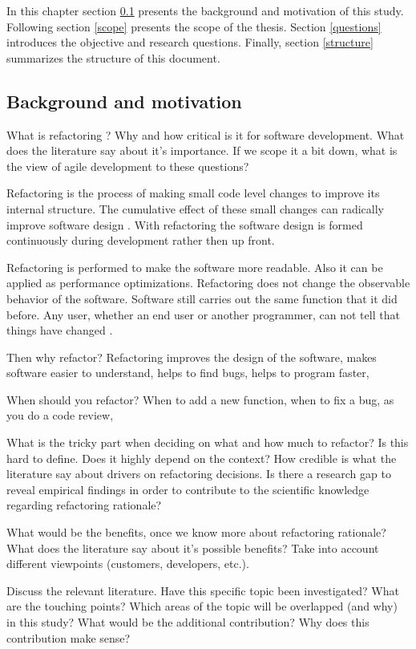 In this chapter section \ref{background} presents the background and motivation of this study. Following section \ref{scope} presents the scope of the thesis. Section \ref{questions} introduces the objective and research questions. Finally, section \ref{structure} summarizes the structure of this document. 
\subsection{Background and motivation} \label{background}
What is refactoring \cite{fowlerRefactor}? Why and how critical is it for software development. What does the literature say about it's importance. If we scope it a bit down, what is the view of agile development to these questions?

Refactoring is the process of making small code level changes to improve its internal structure. The cumulative effect of these small changes can radically improve software design \cite{fowlerRefactor}. With refactoring the software design is formed continuously during development rather then up front. 

Refactoring is performed to make the software more readable. Also it can be applied as performance optimizations. Refactoring does not change the observable behavior of the software. Software still carries out the same function that it did before. Any user, whether an end user or another programmer, can not tell that things have changed \cite{fowlerRefactor}.  

Then why refactor? Refactoring improves the design of the software, makes software easier to understand, helps to find bugs, helps to program faster, 

When should you refactor? When to add a new function, when to fix a bug, as you do a code review, 

What is the tricky part when deciding on what and how much to refactor? Is this hard to define. Does it highly depend on the context? How credible is what the literature say about drivers on refactoring decisions. Is there a research gap to reveal empirical findings in order to contribute to the scientific knowledge regarding refactoring rationale?

What would be the benefits, once we know more about refactoring rationale? What does the literature say about it's possible benefits? Take into account different viewpoints (customers, developers, etc.).

Discuss the relevant literature. Have this specific topic been investigated? What are the touching points? Which areas of the topic will be overlapped (and why) in this study? What would be the additional contribution? Why does this contribution make sense?

